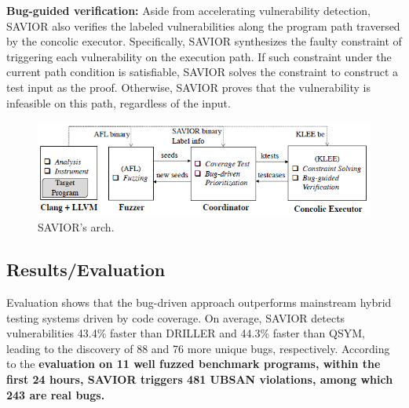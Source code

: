 \textbf{Bug-guided verification: }Aside from accelerating vulnerability
detection, SAVIOR also verifies the labeled vulnerabilities
along the program path traversed by the concolic executor.
Specifically, SAVIOR synthesizes the faulty constraint of
triggering each vulnerability on the execution path. If such
constraint under the current path condition is satisfiable,
SAVIOR solves the constraint to construct a test input as
the proof. Otherwise, SAVIOR proves that the vulnerability
is infeasible on this path, regardless of the input.

\begin{figure}[t]
    \centering
    \includegraphics[scale=0.9]{savior.png} %
    \caption{SAVIOR's arch.}	
    \label{fig:savior}
\end{figure}

\subsection{Results/Evaluation %
}
Evaluation shows that the bug-driven approach outperforms mainstream
 hybrid testing systems driven by code coverage. On average, SAVIOR
detects vulnerabilities 43.4\% faster than DRILLER and 44.3\%
faster than QSYM, leading to the discovery of 88 and 76 more
unique bugs, respectively. According to the \textbf{evaluation on 11 well
fuzzed benchmark programs, within the first 24 hours, SAVIOR
triggers 481 UBSAN violations, among which 243 are real bugs.}

